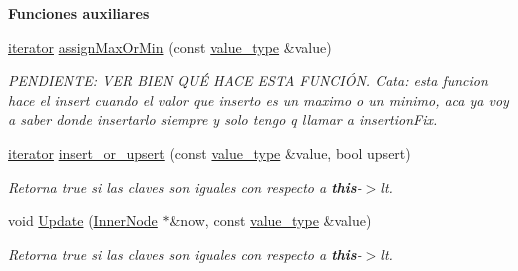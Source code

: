 \begin{Indent}{\bf Funciones auxiliares}
\begin{DoxyCompactItemize}
\hyperlink{classaed2_1_1map_1_1iterator}{iterator} \hyperlink{classaed2_1_1map_a50aae07014200a53b95394f349f55948_a50aae07014200a53b95394f349f55948}{assign\+Max\+Or\+Min} (const \hyperlink{classaed2_1_1map_a719db98e0ff9a837610f76be33264680_a719db98e0ff9a837610f76be33264680}{value\+\_\+type} \&value)
\begin{DoxyCompactList}\small\item\em P\+E\+N\+D\+I\+E\+N\+TE\+: V\+ER B\+I\+EN Q\+UÉ H\+A\+CE E\+S\+TA F\+U\+N\+C\+IÓN. Cata\+: esta funcion hace el insert cuando el valor que inserto es un maximo o un minimo, aca ya voy a saber donde insertarlo siempre y solo tengo q llamar a insertion\+Fix. \end{DoxyCompactList}\item 
\hyperlink{classaed2_1_1map_1_1iterator}{iterator} \hyperlink{classaed2_1_1map_aef47582a93a069c4ec95da8c595e4fee_aef47582a93a069c4ec95da8c595e4fee}{insert\+\_\+or\+\_\+upsert} (const \hyperlink{classaed2_1_1map_a719db98e0ff9a837610f76be33264680_a719db98e0ff9a837610f76be33264680}{value\+\_\+type} \&value, bool upsert)
\begin{DoxyCompactList}\small\item\em Retorna true si las claves son iguales con respecto a {\bfseries this}-\/$>$lt. \end{DoxyCompactList}\item 
void \hyperlink{classaed2_1_1map_ad56871b0800aa1ba7df2eef904a35743_ad56871b0800aa1ba7df2eef904a35743}{Update} (\hyperlink{structaed2_1_1map_1_1InnerNode}{Inner\+Node} $\ast$\&now, const \hyperlink{classaed2_1_1map_a719db98e0ff9a837610f76be33264680_a719db98e0ff9a837610f76be33264680}{value\+\_\+type} \&value)
\begin{DoxyCompactList}\small\item\em Retorna true si las claves son iguales con respecto a {\bfseries this}-\/$>$lt. \end{DoxyCompactList}\end{DoxyCompactItemize}
\end{Indent}
